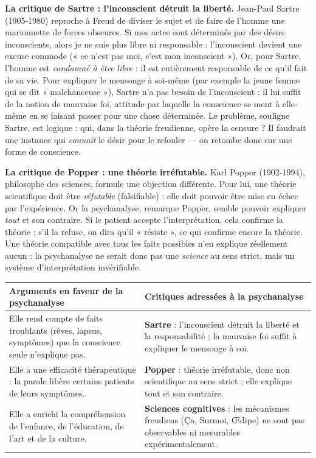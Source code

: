 \documentclass[11pt]{article}
\newcommand{\cle}[1]{{\popxbold\color{popdark}#1}}
\begin{document}
\textbf{La critique de Sartre : l'inconscient détruit la liberté.} Jean-Paul \cle{Sartre} (1905-1980) reproche à Freud de diviser le sujet et de faire de l'homme une marionnette de forces obscures. Si mes actes sont déterminés par des désirs inconscients, alors je ne suis plus libre ni responsable : l'inconscient devient une excuse commode (« ce n'est pas moi, c'est mon inconscient »). Or, pour Sartre, l'homme est \emph{condamné à être libre} : il est entièrement responsable de ce qu'il fait de sa vie. Pour expliquer le mensonge à soi-même (par exemple la jeune femme qui se dit « malchanceuse »), Sartre n'a pas besoin de l'inconscient : il lui suffit de la notion de \cle{mauvaise foi}, attitude par laquelle la conscience se ment à elle-même en se faisant passer pour une chose déterminée. Le problème, souligne Sartre, est logique : qui, dans la théorie freudienne, opère la censure ? Il faudrait une instance qui \emph{connaît} le désir pour le refouler — on retombe donc sur une forme de conscience.

\textbf{La critique de Popper : une théorie irréfutable.} Karl \cle{Popper} (1902-1994), philosophe des sciences, formule une objection différente. Pour lui, une théorie scientifique doit être \emph{réfutable} (falsifiable) : elle doit pouvoir être mise en échec par l'expérience. Or la psychanalyse, remarque Popper, semble pouvoir expliquer \emph{tout} et son contraire. Si le patient accepte l'interprétation, cela confirme la théorie ; s'il la refuse, on dira qu'il « résiste », ce qui confirme encore la théorie. Une théorie compatible avec tous les faits possibles n'en explique réellement aucun : la psychanalyse ne serait donc pas une \emph{science} au sens strict, mais un système d'interprétation invérifiable.

\begin{center}
\begin{tabularx}{\linewidth}{|X|X|}
\hline
\rowcolor{popblueL} \textbf{Arguments en faveur de la psychanalyse} & \textbf{Critiques adressées à la psychanalyse} \\
\hline
Elle rend compte de faits troublants (rêves, lapsus, symptômes) que la conscience seule n'explique pas. & \textbf{Sartre} : l'inconscient détruit la liberté et la responsabilité ; la mauvaise foi suffit à expliquer le mensonge à soi. \\
\hline
Elle a une efficacité thérapeutique : la parole libère certains patients de leurs symptômes. & \textbf{Popper} : théorie irréfutable, donc non scientifique au sens strict ; elle explique tout et son contraire. \\
\hline
Elle a enrichi la compréhension de l'enfance, de l'éducation, de l'art et de la culture. & \textbf{Sciences cognitives} : les mécanismes freudiens (Ça, Surmoi, Œdipe) ne sont pas observables ni mesurables expérimentalement. \\
\hline
\end{tabularx}
\end{center}
\end{document}
